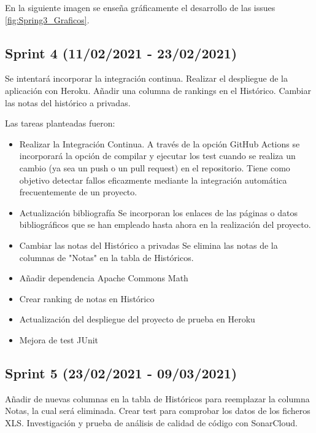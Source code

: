En la siguiente imagen se enseña gráficamente el desarrollo de las issues \ref{fig:Spring3_Graficos}.


\subsection{Sprint 4 (11/02/2021 - 23/02/2021)}
Se intentará incorporar la integración continua. Realizar el despliegue de la aplicación con Heroku. Añadir una columna de rankings en el Histórico. Cambiar las notas del histórico a privadas.

Las tareas planteadas fueron:
\begin{itemize}
	\tightlist
	\item Realizar la Integración Continua.
	A través de la opción GitHub Actions se incorporará la opción de compilar y ejecutar los test cuando se realiza un cambio (ya sea un push o un pull request) en el repositorio. Tiene como objetivo detectar fallos eficazmente mediante la integración automática frecuentemente de un proyecto. 
	\item Actualización bibliografía
	Se incorporan los enlaces de las páginas o datos bibliográficos que se han empleado hasta ahora en la realización del proyecto.
	\item Cambiar las notas del Histórico a privadas
	Se elimina las notas de la columnas de "Notas" en la tabla de Históricos. 
	\item Añadir dependencia Apache Commons Math
	\item Crear ranking de notas en Histórico
	\item Actualización del despliegue del proyecto de prueba en Heroku 
	\item Mejora de test JUnit
	
\end{itemize}

\subsection{Sprint 5 (23/02/2021 - 09/03/2021)}
Añadir de nuevas columnas en la tabla de Históricos para reemplazar la columna Notas, la cual será eliminada. Crear test para comprobar los datos de los ficheros XLS. Investigación y prueba de análisis de calidad de código con SonarCloud.

